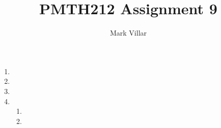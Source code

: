 \documentclass[12pt]{amsart}
\title{PMTH212 Assignment 9}
\author{Mark Villar}
\begin{document}
 

\maketitle 

\begin{enumerate}
	
	\item
		
	\item
		
	\item 
				
	\item 
		
		\begin{enumerate}
		
			\item
			
			\item
		
		\end{enumerate}
	
\end{enumerate}
\end{document}
